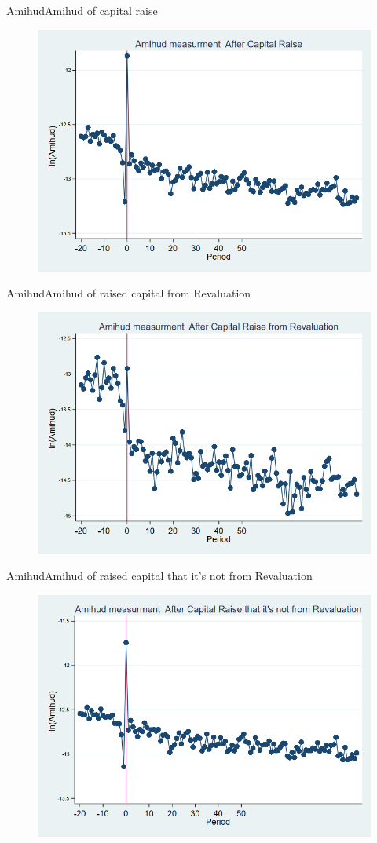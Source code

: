 \documentclass{beamer}
\begin{document}
	\begin{frame}{Amihud}{Amihud of capital raise}
		\begin{figure}
			\centering
			\includegraphics[width=0.7\linewidth]{Output/Amihud.png}
			\label{fig:amihud}
		\end{figure}
	\end{frame}
	
	
	
	\begin{frame}{Amihud}{Amihud of raised capital from Revaluation}
		\begin{figure}
			\centering
			\includegraphics[width=0.7\linewidth]{Output/Amihud_Revaluation.png}
			\label{fig:amihudrevaluation}
		\end{figure}
	\end{frame}
	
	\begin{frame}{Amihud}{Amihud of raised capital that it's not from Revaluation}
		\begin{figure}
			\centering
			\includegraphics[width=0.7\linewidth]{Output/Amihud_NoRevaluation.png}
			\label{fig:amihudnorevaluation}
		\end{figure}
	\end{frame}
	
	
	
	
	
\end{document}
